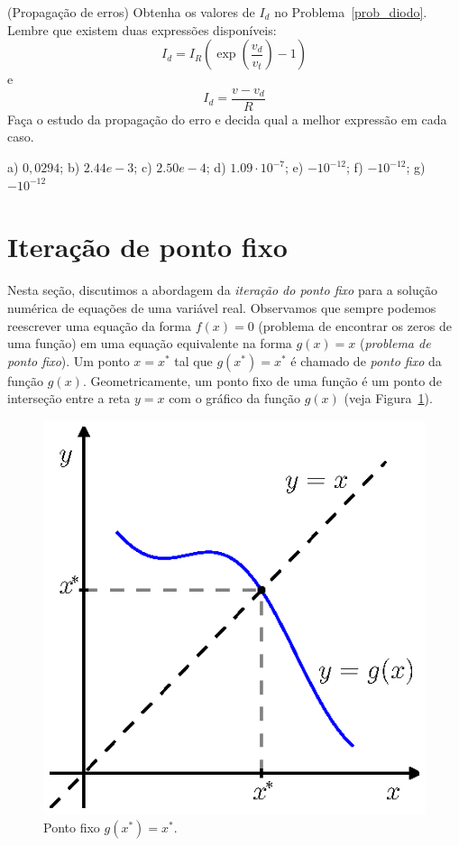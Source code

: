 \begin{exer}(Propagação de erros) Obtenha os valores de $I_d$ no Problema~\ref{prob_diodo}. Lembre que existem duas expressões disponíveis:
  \begin{equation}
    I_d=I_R\left(\exp\left(\frac{v_d}{v_t}\right)-1\right)
  \end{equation}
e
\begin{equation}
  I_d=\frac{v-v_d}{R}
\end{equation}
Faça o estudo da propagação do erro e decida qual a melhor expressão em cada caso.
\end{exer}
\begin{resp}
  a) $0,0294$; b) $2.44e-3$; c) $2.50e-4$; d) $1.09\cdot 10^{-7}$; e) $- 10^{-12}$; f) $-10^{-12}$; g) $- 10^{-12}$
\end{resp}

\section{Iteração de ponto fixo}

Nesta seção, discutimos a abordagem da \emph{iteração do ponto fixo} para a solução numérica de equações de uma variável real. Observamos que sempre podemos reescrever uma equação da forma $f(x) = 0$ (problema de encontrar os zeros de uma função) em uma equação equivalente na forma $g(x) = x$ (\emph{problema de ponto fixo}). Um ponto $x = x^*$ tal que $g(x^*) = x^*$ é chamado de \emph{ponto fixo} da função $g(x)$. Geometricamente, um ponto fixo de uma função é um ponto de interseção entre a reta $y = x$ com o gráfico da função $g(x)$ (veja Figura~\ref{fig:defn_ponto_fixo}).

\begin{figure}[h]
  \centering
  \includegraphics{./cap_equacao1d/pics/defn_ponto_fixo/defn_ponto_fixo.eps}
  \caption{Ponto fixo $g(x^*) = x^*$.}
  \label{fig:defn_ponto_fixo}
\end{figure}

